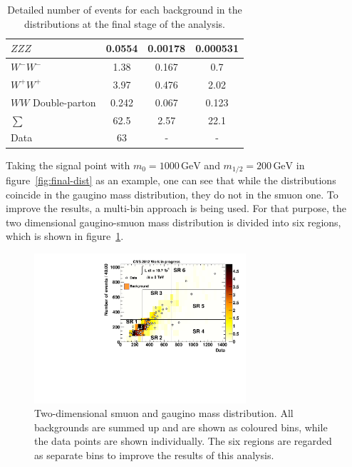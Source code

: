 \begin{table}[!htb]
\begin{tabular}{|l|c|c|c|}
    $ZZZ$                           & 0.0554                               & 0.00178 & 0.000531                  \\ \hline
    $W^- W^-$                       & 1.38                                 & 0.167   & 0.7                       \\
    $W^+ W^+$                       & 3.97                                 & 0.476   & 2.02                      \\
    $WW$ Double-parton              & 0.242                                & 0.067   & 0.123                     \\ \hline
    $\sum$                          & 62.5                                 & 2.57    & 22.1                      \\ \hline
    Data                            & 63                                   & -       & -                         \\ \hline
  \end{tabular}
  \caption{Detailed number of events for each background in the distributions at the final stage of the analysis.}
  \label{tab:nev-msmuon}
\end{table}

\noindent Taking the signal point with $m_0 = 1000\,\text{GeV}$ and $m_{1/2} = 200\,\text{GeV}$ in figure~\ref{fig:final-dist} as an example, one can see that while the distributions coincide in the gaugino mass distribution, they do not in the smuon one. To improve the results, a multi-bin approach is being used. For that purpose, the two dimensional gaugino-smuon mass distribution is divided into six regions, which is shown in figure~\ref{fig:m_smu_chi}.

\begin{figure}[!htb]
  \centering
  \includegraphics[width=0.7\textwidth]{plots/m_smu_chi.pdf}
  \caption{Two-dimensional smuon and gaugino mass distribution. All backgrounds are summed up and are shown as coloured bins, while the data points are shown individually. The six regions are regarded as separate bins to improve the results of this analysis.}
  \label{fig:m_smu_chi}
\end{figure}


